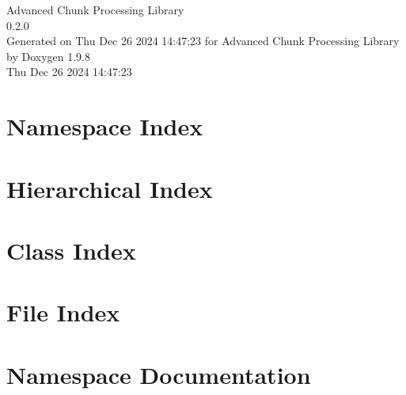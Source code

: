 \documentclass[twoside]{book}
\newcommand{\+}{\discretionary{\mbox{\scriptsize$\hookleftarrow$}}{}{}}
\newcommand{\clearemptydoublepage}{%
    \newpage{\pagestyle{empty}\cleardoublepage}%
  }
\begin{document}
  \raggedbottom
    \hypersetup{pageanchor=false,
                bookmarksnumbered=true,
                pdfencoding=unicode
               }
  \begin{titlepage}
  \vspace*{7cm}
  \begin{center}%
  {\Large Advanced Chunk Processing Library}\\
  [1ex]\large 0.\+2.\+0 \\
  \vspace*{1cm}
  {\large Generated on Thu Dec 26 2024 14\+:47\+:23 for Advanced Chunk Processing Library by Doxygen 1.9.8}\\
    \vspace*{0.5cm}
    {\small Thu Dec 26 2024 14:47:23}
  \end{center}
  \end{titlepage}
  \clearemptydoublepage
  \tableofcontents
  \clearemptydoublepage
  \hypersetup{pageanchor=true}


\chapter{Namespace Index}

\chapter{Hierarchical Index}

\chapter{Class Index}

\chapter{File Index}

\chapter{Namespace Documentation}















\end{document}
